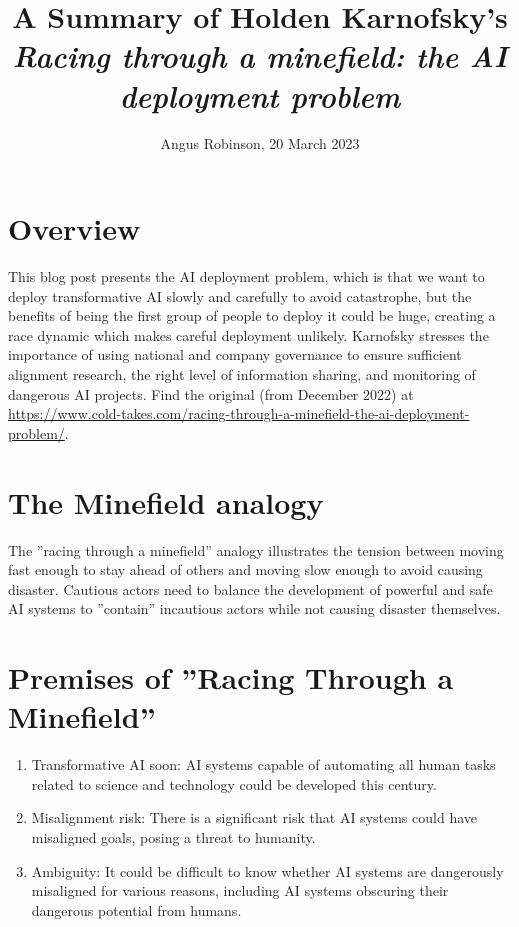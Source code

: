 \documentclass{article}
\title{A Summary of Holden Karnofsky's \textit{Racing through a minefield: the AI deployment problem}}
\author{Angus Robinson, 20 March 2023}
\date{}
\begin{document}

\maketitle
\begin{multicols}{2}

\section{Overview}
This blog post presents the AI deployment problem, which is that we want to deploy transformative AI slowly and carefully to avoid catastrophe, but the benefits of being the first group of people to deploy it could be huge, creating a race dynamic which makes careful deployment unlikely. Karnofsky stresses the importance of using national and company governance to ensure sufficient alignment research, the right level of information sharing, and monitoring of dangerous AI projects. Find the original (from December 2022) at \href{https://www.cold-takes.com/racing-through-a-minefield-the-ai-deployment-problem/}{https://www.cold-takes.com/racing-through-a-minefield-the-ai-deployment-problem/}.

\section*{The Minefield analogy}
The ''racing through a minefield'' analogy illustrates the tension between moving fast enough to stay ahead of others and moving slow enough to avoid causing disaster. Cautious actors need to balance the development of powerful and safe AI systems to ''contain'' incautious actors while not causing disaster themselves.

\section{Premises of ''Racing Through a Minefield''}
\begin{enumerate}
\item Transformative AI soon: AI systems capable of automating all human tasks related to science and technology could be developed this century.
\item Misalignment risk: There is a significant risk that AI systems could have misaligned goals, posing a threat to humanity.
\item Ambiguity: It could be difficult to know whether AI systems are dangerously misaligned for various reasons, including AI systems obscuring their dangerous potential from humans.
\end{enumerate}


\end{multicols}
\end{document}
